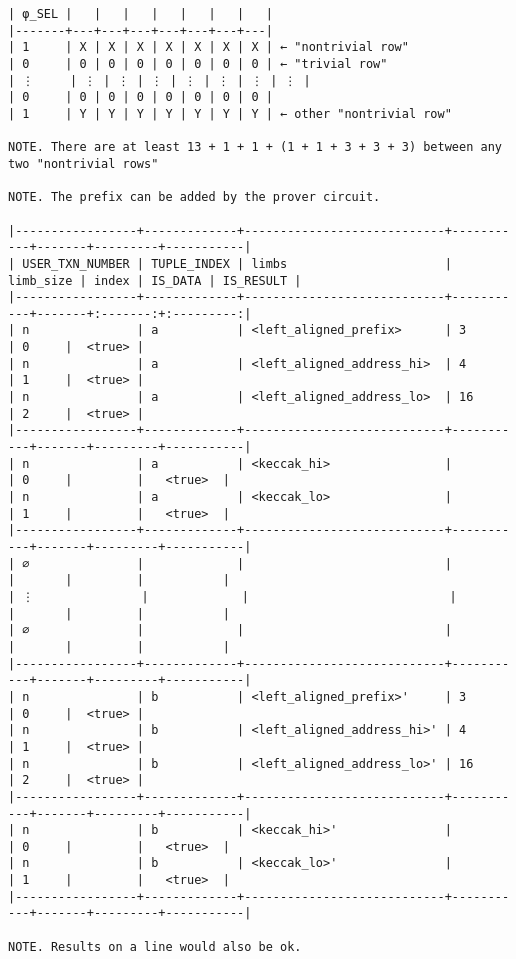 \documentclass[varwidth=\maxdimen,margin=0.5cm,multi={verbatim}]{standalone}
\begin{document}
\begin{verbatim}
| φ_SEL |   |   |   |   |   |   |   |
|-------+---+---+---+---+---+---+---|
| 1     | X | X | X | X | X | X | X | ← "nontrivial row"
| 0     | 0 | 0 | 0 | 0 | 0 | 0 | 0 | ← "trivial row"
| ⋮     | ⋮ | ⋮ | ⋮ | ⋮ | ⋮ | ⋮ | ⋮ |
| 0     | 0 | 0 | 0 | 0 | 0 | 0 | 0 |
| 1     | Y | Y | Y | Y | Y | Y | Y | ← other "nontrivial row"

NOTE. There are at least 13 + 1 + 1 + (1 + 1 + 3 + 3 + 3) between any two "nontrivial rows"

NOTE. The prefix can be added by the prover circuit.

|-----------------+-------------+----------------------------+-----------+-------+---------+-----------|
| USER_TXN_NUMBER | TUPLE_INDEX | limbs                      | limb_size | index | IS_DATA | IS_RESULT |
|-----------------+-------------+----------------------------+-----------+-------+:-------:+:---------:|
| n               | a           | <left_aligned_prefix>      | 3         | 0     |  <true> |
| n               | a           | <left_aligned_address_hi>  | 4         | 1     |  <true> |
| n               | a           | <left_aligned_address_lo>  | 16        | 2     |  <true> |
|-----------------+-------------+----------------------------+-----------+-------+---------+-----------|
| n               | a           | <keccak_hi>                |           | 0     |         |   <true>  |
| n               | a           | <keccak_lo>                |           | 1     |         |   <true>  |
|-----------------+-------------+----------------------------+-----------+-------+---------+-----------|
| ∅               |             |                            |           |       |         |           |
| ⋮               |             |                            |           |       |         |           |
| ∅               |             |                            |           |       |         |           |
|-----------------+-------------+----------------------------+-----------+-------+---------+-----------|
| n               | b           | <left_aligned_prefix>'     | 3         | 0     |  <true> |
| n               | b           | <left_aligned_address_hi>' | 4         | 1     |  <true> |
| n               | b           | <left_aligned_address_lo>' | 16        | 2     |  <true> |
|-----------------+-------------+----------------------------+-----------+-------+---------+-----------|
| n               | b           | <keccak_hi>'               |           | 0     |         |   <true>  |
| n               | b           | <keccak_lo>'               |           | 1     |         |   <true>  |
|-----------------+-------------+----------------------------+-----------+-------+---------+-----------|

NOTE. Results on a line would also be ok.

\end{verbatim}
\end{document}
